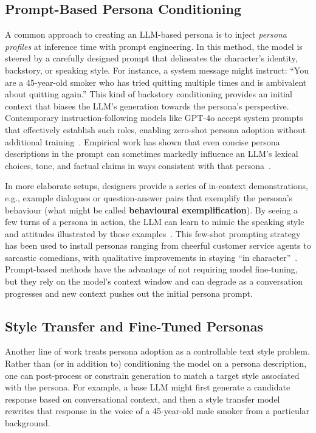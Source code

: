 \subsection{Prompt-Based Persona Conditioning}
A common approach to creating an LLM-based persona is to inject \emph{persona profiles} at inference time with prompt engineering. In this method, the model is steered by a carefully designed prompt that delineates the character's identity, backstory, or speaking style. For instance, a system message might instruct: ``You are a 45-year-old smoker who has tried quitting multiple times and is ambivalent about quitting again.'' This kind of backstory conditioning provides an initial context that biases the LLM's generation towards the persona’s perspective. Contemporary instruction-following models like GPT-4o accept system prompts that effectively establish such roles, enabling zero-shot persona adoption without additional training~\cite{10.5555/3600270.3602281}. Empirical work has shown that even concise persona descriptions in the prompt can sometimes markedly influence an LLM's lexical choices, tone, and factual claims in ways consistent with that persona~\cite{madotto-etal-2019-personalizing, liu-etal-2024-evaluating-large}.

In more elaborate setups, designers provide a series of in-context demonstrations, e.g., example dialogues or question-answer pairs that exemplify the persona's behaviour (what might be called \textbf{behavioural exemplification}). By seeing a few turns of a persona in action, the LLM can learn to mimic the speaking style and attitudes illustrated by those examples~\cite{joshi-etal-2023-persona}. This few-shot prompting strategy has been used to install personas ranging from cheerful customer service agents to sarcastic comedians, with qualitative improvements in staying ``in character''~\cite{gururangan-etal-2020-dont}. Prompt-based methods have the advantage of not requiring model fine-tuning, but they rely on the model's context window and can degrade as a conversation progresses and new context pushes out the initial persona prompt.

\subsection{Style Transfer and Fine-Tuned Personas}
Another line of work treats persona adoption as a controllable text style problem. Rather than (or in addition to) conditioning the model on a persona description, one can post-process or constrain generation to match a target style associated with the persona. For example, a base LLM might first generate a candidate response based on conversational context, and then a style transfer model rewrites that response in the voice of a 45-year-old male smoker from a particular background.

